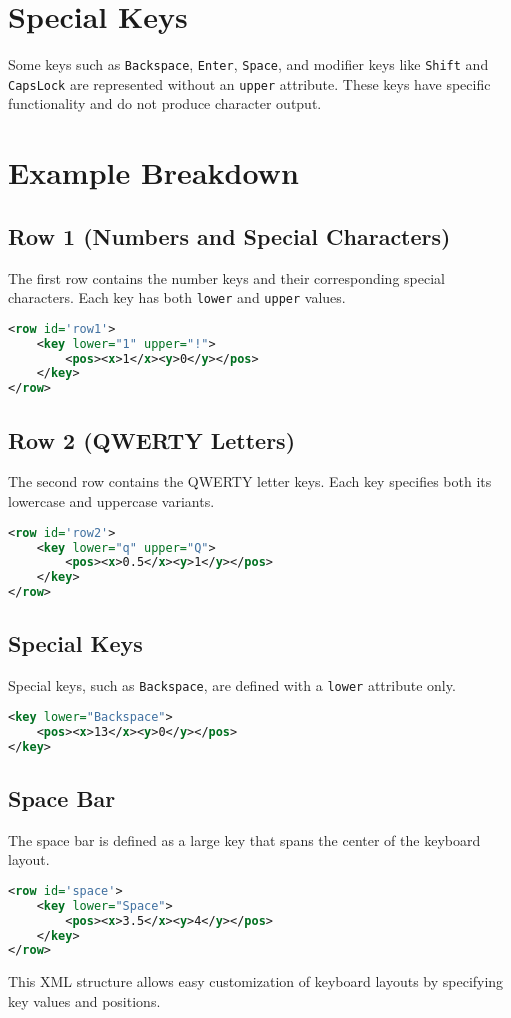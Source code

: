 \documentclass{article}
\begin{document}
\section{Special Keys}
Some keys such as \texttt{Backspace}, \texttt{Enter}, \texttt{Space}, and modifier keys like \texttt{Shift} and \texttt{CapsLock} are represented without an \texttt{upper} attribute. These keys have specific functionality and do not produce character output.

\section{Example Breakdown}
\subsection{Row 1 (Numbers and Special Characters)}
The first row contains the number keys and their corresponding special characters. Each key has both \texttt{lower} and \texttt{upper} values.

\begin{lstlisting}[language=XML]
<row id='row1'>
    <key lower="1" upper="!">
        <pos><x>1</x><y>0</y></pos>
    </key>
</row>
\end{lstlisting}

\subsection{Row 2 (QWERTY Letters)}
The second row contains the QWERTY letter keys. Each key specifies both its lowercase and uppercase variants.

\begin{lstlisting}[language=XML]
<row id='row2'>
    <key lower="q" upper="Q">
        <pos><x>0.5</x><y>1</y></pos>
    </key>
</row>
\end{lstlisting}

\subsection{Special Keys}
Special keys, such as \texttt{Backspace}, are defined with a \texttt{lower} attribute only.

\begin{lstlisting}[language=XML]
<key lower="Backspace">
    <pos><x>13</x><y>0</y></pos>
</key>
\end{lstlisting}

\subsection{Space Bar}
The space bar is defined as a large key that spans the center of the keyboard layout.

\begin{lstlisting}[language=XML]
<row id='space'>
    <key lower="Space">
        <pos><x>3.5</x><y>4</y></pos>
    </key>
</row>
\end{lstlisting}

This XML structure allows easy customization of keyboard layouts by specifying key values and positions.
\end{document}
